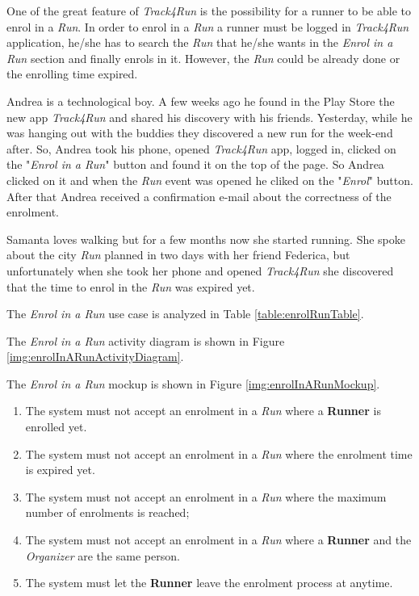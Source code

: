 One of the great feature of \textit{Track4Run} is the possibility for a runner to be able to enrol in a \textit{Run}.
In order to enrol in a \textit{Run} a runner must be logged in \textit{Track4Run} application, he/she has to search the \textit{Run} that he/she wants in the \textit{Enrol in a Run} section and finally enrols in it.
However, the \textit{Run} could be already done or the enrolling time expired.

Andrea is a technological boy. A few weeks ago he found in the Play Store the new app \textit{Track4Run} and shared his discovery with his friends. Yesterday, while he was hanging out with the buddies they discovered a new run for the week-end after.
So, Andrea took his phone, opened \textit{Track4Run} app, logged in, clicked on the "\textit{Enrol in a Run}" button and found it on the top of the page. So Andrea clicked on it and when the \textit{Run} event was opened he cliked on the "\textit{Enrol}" button.
After that Andrea received a confirmation e-mail about the correctness of the enrolment.

Samanta loves walking but for a few months now she started running. She spoke about the city \textit{Run} planned in two days with her friend Federica, but unfortunately when she took her phone and opened \textit{Track4Run} she discovered that the time to enrol in the \textit{Run} was expired yet.

The \textit{Enrol in a Run} use case is analyzed in Table \ref{table:enrolRunTable}.

The \textit{Enrol in a Run} activity diagram is shown in Figure \ref{img:enrolInARunActivityDiagram}.

The \textit{Enrol in a Run} mockup is shown in Figure \ref{img:enrolInARunMockup}.

\begin{enumerate}
  \item The system must not accept an enrolment in a \textit{Run} where a \textbf{Runner} is enrolled yet.
  \item The system must not accept an enrolment in a \textit{Run} where the enrolment time is expired yet.
  \item The system must not accept an enrolment in a \textit{Run} where the maximum number of enrolments is reached;
  \item The system must not accept an enrolment in a \textit{Run} where a \textbf{Runner} and the \textit{Organizer} are the same person.
  \item The system must let the \textbf{Runner} leave the enrolment process at anytime.
\end{enumerate}

